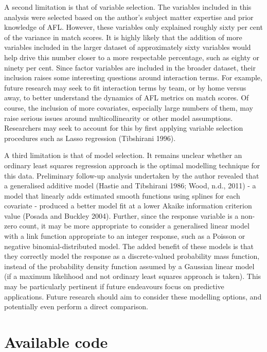 \documentclass{article}
\begin{document}
A second limitation is that of variable selection. The variables included in this analysis were selected based on the author's subject matter expertise and prior knowledge of AFL. However, these variables only explained roughly sixty per cent of the variance in match scores. It is highly likely that the addition of more variables included in the larger dataset of approximately sixty variables would help drive this number closer to a more respectable percentage, such as eighty or ninety per cent. Since factor variables are included in the broader dataset, their inclusion raises some interesting questions around interaction terms. For example, future research may seek to fit interaction terms by team, or by home versus away, to better understand the dynamics of AFL metrics on match scores. Of course, the inclusion of more covariates, especially large numbers of them, may raise serious issues around multicollinearity or other model assumptions. Researchers may seek to account for this by first applying variable selection procedures such as Lasso regression (Tibshirani 1996).

A third limitation is that of model selection. It remains unclear whether an ordinary least squares regression approach is the optimal modelling technique for this data. Preliminary follow-up analysis undertaken by the author revealed that a generalised additive model (Hastie and Tibshirani 1986; Wood, n.d., 2011) - a model that linearly adds estimated smooth functions using splines for each covariate - produced a better model fit at a lower Akaike information criterion value (Posada and Buckley 2004). Further, since the response variable is a non-zero count, it may be more appropriate to consider a generalised linear model with a link function appropriate to an integer response, such as a Poisson or negative binomial-distributed model. The added benefit of these models is that they correctly model the response as a discrete-valued probability mass function, instead of the probability density function assumed by a Gaussian linear model (if a maximum likelihood and not ordinary least squares approach is taken). This may be particularly pertinent if future endeavours focus on predictive applications. Future research should aim to consider these modelling options, and potentially even perform a direct comparison.

\hypertarget{available-code}{%
\section{Available code}\label{available-code}}
\end{document}
